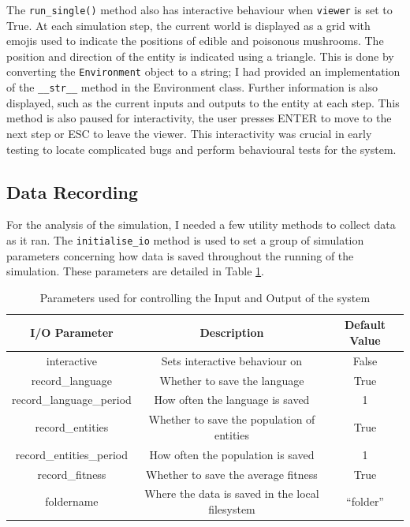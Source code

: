 \documentclass[12pt,a4paper,twoside,openright]{report}
\begin{document}
The \texttt{run\_single()} method also has interactive behaviour when \texttt{viewer} is set to True. At each simulation step, the current world is displayed as a grid with emojis used to indicate the positions of edible and poisonous mushrooms. The position and direction of the entity is indicated using a triangle. This is done by converting the \texttt{Environment} object to a string; I had provided an implementation of the \texttt{\_\_str\_\_} method in the Environment class. Further information is also displayed, such as the current inputs and outputs to the entity at each step. This method is also paused for interactivity, the user presses ENTER to move to the next step or ESC to leave the viewer. This interactivity was crucial in early testing to locate complicated bugs and perform behavioural tests for the system.

\subsection{Data Recording}

For the analysis of the simulation, I needed a few utility methods to collect data as it ran. The \texttt{initialise\_io} method is used to set a group of simulation parameters concerning how data is saved throughout the running of the simulation. These parameters are detailed in Table \ref{table:io-params}.

\begin{table}[t]
\centering
 \begin{tabular}{ c | c | c}
 \bf{I/O Parameter} & \bf{Description} & \bf{Default Value} \\ [0.5ex] 
 \hline
interactive & Sets interactive behaviour on & False \\
record\_language & Whether to save the language & True \\
record\_language\_period & How often the language is saved & 1 \\
record\_entities & Whether to save the population of entities & True \\
record\_entities\_period & How often the population is saved & 1 \\
record\_fitness & Whether to save the average fitness & True \\
foldername & Where the data is saved in the local filesystem & ``folder'' \\
\end{tabular}
\caption{Parameters used for controlling the Input and Output of the system}
\label{table:io-params}
\end{table}
\end{document}
